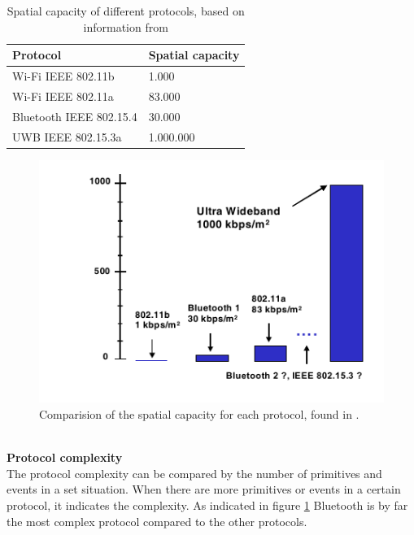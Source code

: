 \documentclass[10pt,a4paper]{article}
\begin{document}
\begin{table}[H]
\centering
\caption{Spatial capacity of different protocols, based on information from \cite{ultrawidebandshortmediumrange}}
\label{spatialcapacity}
\begin{tabular}{|l|l|}
\hline
\textbf{Protocol}  & \textbf{Spatial capacity} \\ \hline
Wi-Fi IEEE 802.11b & 1.000                     \\ \hline
Wi-Fi IEEE 802.11a & 83.000                    \\ \hline
Bluetooth IEEE 802.15.4          & 30.000                    \\ \hline
UWB IEEE 802.15.3a                & 1.000.000                 \\ \hline
\end{tabular}
\end{table}

\begin{figure}[H]
   \centering
   \includegraphics[width=1\textwidth]{spatialcapacity}
   \caption{Comparision of the spatial capacity for each protocol, found in \cite{ultrawidebandshortmediumrange}.}
   \label{fig:protocolcomplexity}
\end{figure}

\textbf{\\Protocol complexity}\\
The protocol complexity can be compared by the number of primitives and events in a set situation. When there are more primitives or events in a certain protocol, it indicates the complexity. \cite{comparitivestudywirelessprotocols} As indicated in figure \ref{fig:protocolcomplexity} Bluetooth is by far the most complex protocol compared to the other protocols.
\end{document}
